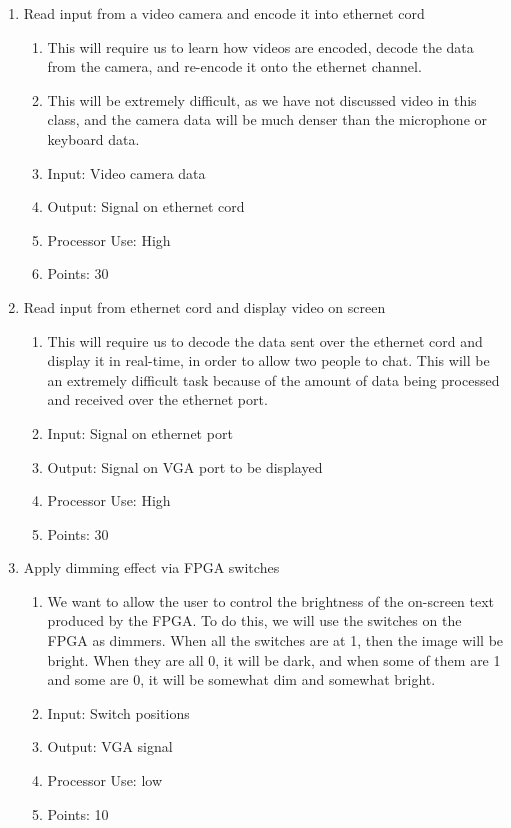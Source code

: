 \documentclass[letterpaper]{article}
\begin{document}
\begin{enumerate}
\item Read input from a video camera and encode it into ethernet cord
\begin{enumerate}
\item This will require us to learn how videos are encoded, decode the data from the camera, and re-encode it onto the ethernet channel.
\item This will be extremely difficult, as we have not discussed video in this class, and the camera data will be much denser than the microphone or keyboard data.
\item Input: Video camera data
\item Output: Signal on ethernet cord
\item Processor Use: High
\item Points: 30
\end{enumerate}

\item Read input from ethernet cord and display video on screen
\begin{enumerate}
\item This will require us to decode the data sent over the ethernet cord and display it in real-time, in order to allow two people to chat. This will be an extremely difficult task because of the amount of data being processed and received over the ethernet port.
\item Input: Signal on ethernet port
\item Output: Signal on VGA port to be displayed
\item Processor Use: High
\item Points: 30
\end{enumerate}

\item Apply dimming effect via FPGA switches
\begin{enumerate}
\item We want to allow the user to control the brightness of the on-screen text produced by the FPGA. To do this, we will use the switches on the FPGA as dimmers. When all the switches are at 1, then the image will be bright. When they are all 0, it will be dark, and when some of them are 1 and some are 0, it will be somewhat dim and somewhat bright.
\item Input: Switch positions
\item Output: VGA signal
\item Processor Use: low
\item Points: 10
\end{enumerate}


\end{enumerate}
\end{document}
